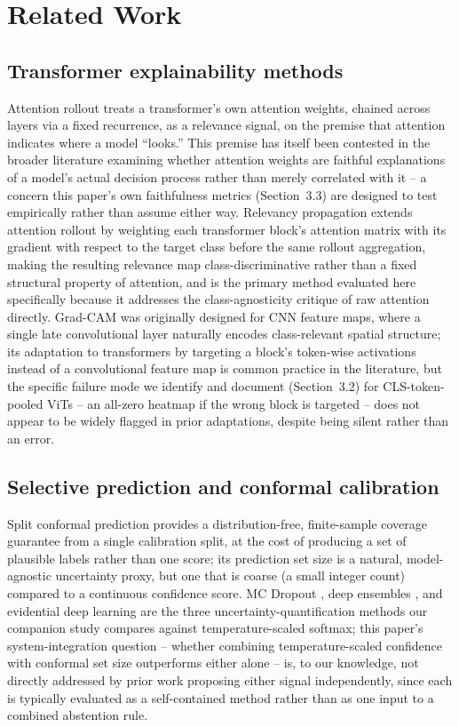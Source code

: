 \documentclass[runningheads]{llncs}
\begin{document}
\section{Related Work}

\subsection{Transformer explainability methods}

Attention rollout \cite{abnar2020quantifying} treats a transformer's own
attention weights, chained across layers via a fixed recurrence, as a
relevance signal, on the premise that attention indicates where a model
``looks.'' This premise has itself been contested in the broader
literature examining whether attention weights are faithful explanations
of a model's actual decision process rather than merely correlated with
it -- a concern this paper's own faithfulness metrics (Section~3.3) are
designed to test empirically rather than assume either way. Relevancy
propagation \cite{chefer2021transformer} extends attention rollout by
weighting each transformer block's attention matrix with its gradient
with respect to the target class before the same rollout aggregation,
making the resulting relevance map class-discriminative rather than a
fixed structural property of attention, and is the primary method
evaluated here specifically because it addresses the class-agnosticity
critique of raw attention directly. Grad-CAM \cite{selvaraju2017gradcam}
was originally designed for CNN feature maps, where a single late
convolutional layer naturally encodes class-relevant spatial structure;
its adaptation to transformers by targeting a block's token-wise
activations instead of a convolutional feature map is common practice in
the literature, but the specific failure mode we identify and document
(Section~3.2) for CLS-token-pooled ViTs -- an all-zero heatmap if the
wrong block is targeted -- does not appear to be widely flagged in prior
adaptations, despite being silent rather than an error.

\subsection{Selective prediction and conformal calibration}

Split conformal prediction provides a distribution-free, finite-sample
coverage guarantee from a single calibration split, at the cost of
producing a set of plausible labels rather than one score; its prediction
set size is a natural, model-agnostic uncertainty proxy, but one that is
coarse (a small integer count) compared to a continuous confidence score.
MC Dropout \cite{gal2016dropout}, deep ensembles
\cite{lakshminarayanan2017ensembles}, and evidential deep learning
\cite{sensoy2018evidential} are the three uncertainty-quantification
methods our companion study compares against temperature-scaled softmax;
this paper's system-integration question -- whether combining
temperature-scaled confidence with conformal set size outperforms either
alone -- is, to our knowledge, not directly addressed by prior work
proposing either signal independently, since each is typically evaluated
as a self-contained method rather than as one input to a combined
abstention rule.
\end{document}
